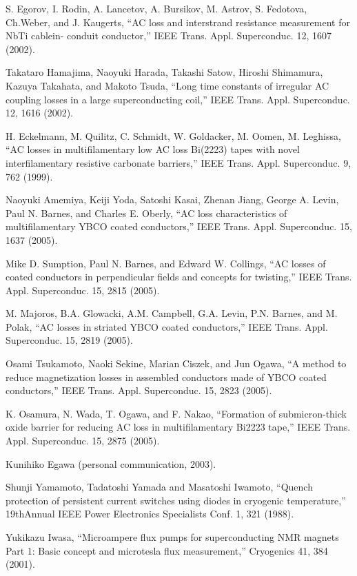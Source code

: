 \noindent [7.106] S. Egorov, I. Rodin, A. Lancetov, A. Bursikov, M. Astrov, S. Fedotova, Ch.Weber,
and J. Kaugerts, ``AC loss and interstrand resistance measurement for NbTi cablein-
conduit conductor,” IEEE Trans. Appl. Superconduc. 12, 1607 (2002).

\noindent [7.107] Takataro Hamajima, Naoyuki Harada, Takashi Satow, Hiroshi Shimamura, Kazuya
Takahata, and Makoto Tsuda, ``Long time constants of irregular AC coupling
losses in a large superconducting coil,” IEEE Trans. Appl. Superconduc. 12, 1616
(2002).

\noindent [7.108] H. Eckelmann, M. Quilitz, C. Schmidt, W. Goldacker, M. Oomen, M. Leghissa,
``AC losses in multifilamentary low AC loss Bi(2223) tapes with novel interfilamentary
resistive carbonate barriers,” IEEE Trans. Appl. Superconduc. 9, 762
(1999).

\noindent [7.109] Naoyuki Amemiya, Keiji Yoda, Satoshi Kasai, Zhenan Jiang, George A. Levin,
Paul N. Barnes, and Charles E. Oberly, ``AC loss characteristics of multifilamentary
YBCO coated conductors,” IEEE Trans. Appl. Superconduc. 15, 1637
(2005).

\noindent [7.110] Mike D. Sumption, Paul N. Barnes, and Edward W. Collings, 
``AC losses of coated conductors in perpendicular fields and concepts for twisting,” IEEE Trans. Appl. Superconduc. 15, 2815 (2005).

\noindent [7.111] M. Majoros, B.A. Glowacki, A.M. Campbell, G.A. Levin, P.N. Barnes, and M. Polak,
``AC losses in striated YBCO coated conductors,” IEEE Trans. Appl. Superconduc.
15, 2819 (2005).

\noindent [7.112] Osami Tsukamoto, Naoki Sekine, Marian Ciszek, and Jun Ogawa, ``A method
to reduce magnetization losses in assembled conductors made of YBCO coated
conductors,” IEEE Trans. Appl. Superconduc. 15, 2823 (2005).

\noindent [7.113] K. Osamura, N. Wada, T. Ogawa, and F. Nakao, ``Formation of submicron-thick
oxide barrier for reducing AC loss in multifilamentary Bi2223 tape,” IEEE Trans.
Appl. Superconduc. 15, 2875 (2005).

\noindent [7.114] Kunihiko Egawa (personal communication, 2003).

\noindent [7.115] Shunji Yamamoto, Tadatoshi Yamada and Masatoshi Iwamoto, 
``Quench protection of persistent current switches using diodes in cryogenic temperature,” 19thAnnual IEEE Power Electronics Specialists Conf. 1, 321 (1988).

\noindent [7.116] Yukikazu Iwasa, ``Microampere flux pumps for superconducting NMR magnets Part 1: Basic concept and microtesla flux measurement,” 
Cryogenics 41, 384 (2001).

